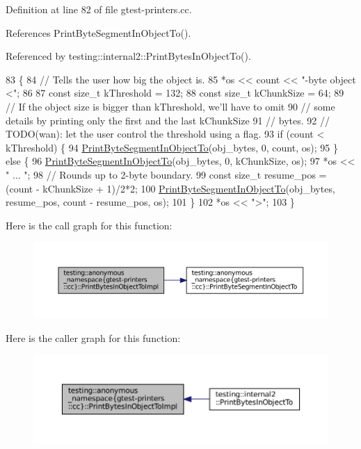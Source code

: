 Definition at line 82 of file gtest-\/printers.\+cc.



References Print\+Byte\+Segment\+In\+Object\+To().



Referenced by testing\+::internal2\+::\+Print\+Bytes\+In\+Object\+To().


\begin{DoxyCode}
83                                            \{
84   \textcolor{comment}{// Tells the user how big the object is.}
85   *os << count << \textcolor{stringliteral}{"-byte object <"};
86 
87   \textcolor{keyword}{const} \textcolor{keywordtype}{size\_t} kThreshold = 132;
88   \textcolor{keyword}{const} \textcolor{keywordtype}{size\_t} kChunkSize = 64;
89   \textcolor{comment}{// If the object size is bigger than kThreshold, we'll have to omit}
90   \textcolor{comment}{// some details by printing only the first and the last kChunkSize}
91   \textcolor{comment}{// bytes.}
92   \textcolor{comment}{// TODO(wan): let the user control the threshold using a flag.}
93   \textcolor{keywordflow}{if} (count < kThreshold) \{
94     \hyperlink{namespacetesting_1_1anonymous__namespace_02gtest-printers_8cc_03_ad297ce40861f170a8269e26a7df2b826}{PrintByteSegmentInObjectTo}(obj\_bytes, 0, count, os);
95   \} \textcolor{keywordflow}{else} \{
96     \hyperlink{namespacetesting_1_1anonymous__namespace_02gtest-printers_8cc_03_ad297ce40861f170a8269e26a7df2b826}{PrintByteSegmentInObjectTo}(obj\_bytes, 0, kChunkSize, os);
97     *os << \textcolor{stringliteral}{" ... "};
98     \textcolor{comment}{// Rounds up to 2-byte boundary.}
99     \textcolor{keyword}{const} \textcolor{keywordtype}{size\_t} resume\_pos = (count - kChunkSize + 1)/2*2;
100     \hyperlink{namespacetesting_1_1anonymous__namespace_02gtest-printers_8cc_03_ad297ce40861f170a8269e26a7df2b826}{PrintByteSegmentInObjectTo}(obj\_bytes, resume\_pos, count - resume\_pos, os);
101   \}
102   *os << \textcolor{stringliteral}{">"};
103 \}
\end{DoxyCode}
Here is the call graph for this function\+:
\nopagebreak
\begin{figure}[H]
\begin{center}
\leavevmode
\includegraphics[width=350pt]{namespacetesting_1_1anonymous__namespace_02gtest-printers_8cc_03_a7c3551691f3b4ab868eb5b8ceba41bde_cgraph}
\end{center}
\end{figure}
Here is the caller graph for this function\+:
\nopagebreak
\begin{figure}[H]
\begin{center}
\leavevmode
\includegraphics[width=350pt]{namespacetesting_1_1anonymous__namespace_02gtest-printers_8cc_03_a7c3551691f3b4ab868eb5b8ceba41bde_icgraph}
\end{center}
\end{figure}
